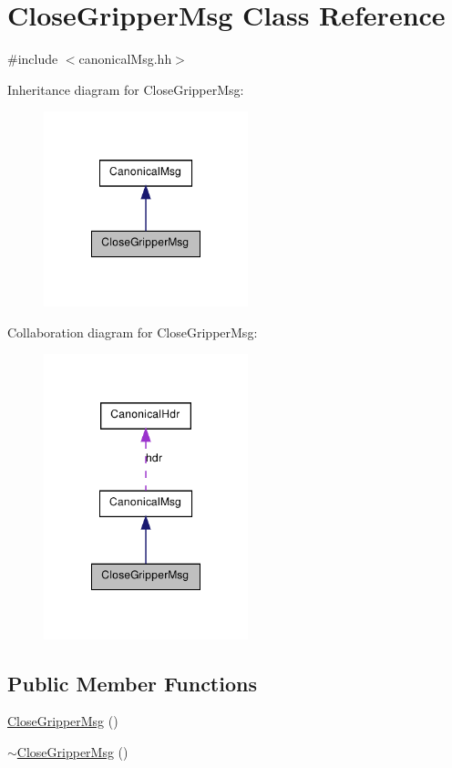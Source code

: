 \hypertarget{class_close_gripper_msg}{
\section{CloseGripperMsg Class Reference}
\label{class_close_gripper_msg}
}


{\ttfamily \#include $<$canonicalMsg.hh$>$}



Inheritance diagram for CloseGripperMsg:\nopagebreak
\begin{figure}[H]
\begin{center}
\leavevmode
\includegraphics[width=168pt]{class_close_gripper_msg__inherit__graph}
\end{center}
\end{figure}


Collaboration diagram for CloseGripperMsg:\nopagebreak
\begin{figure}[H]
\begin{center}
\leavevmode
\includegraphics[width=168pt]{class_close_gripper_msg__coll__graph}
\end{center}
\end{figure}
\subsection*{Public Member Functions}
\begin{DoxyCompactItemize}
\item 
\hyperlink{class_close_gripper_msg_a6a9dab1776907abd3a9d5e4d82c8946d}{CloseGripperMsg} ()
\item 
\hyperlink{class_close_gripper_msg_a3509d8bb099aa32b1d2d8072c291a1b5}{$\sim$CloseGripperMsg} ()
\end{DoxyCompactItemize}


